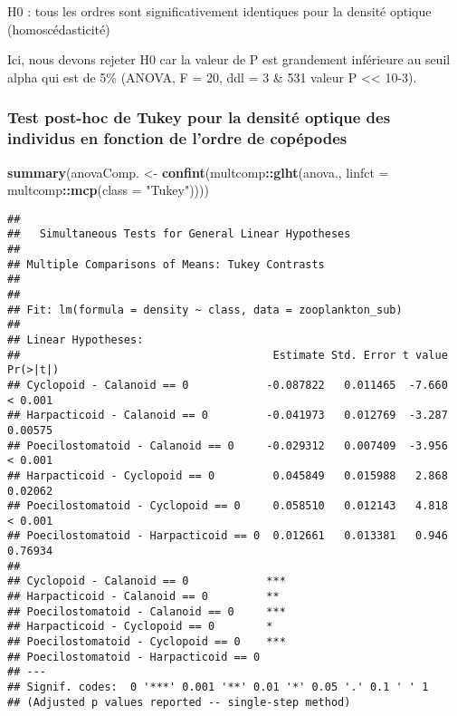 \documentclass[]{article}
\newenvironment{Shaded}{\begin{snugshade}}{\end{snugshade}}
\newcommand{\KeywordTok}[1]{\textcolor[rgb]{0.13,0.29,0.53}{\textbf{#1}}}
\newcommand{\DataTypeTok}[1]{\textcolor[rgb]{0.13,0.29,0.53}{#1}}
\newcommand{\StringTok}[1]{\textcolor[rgb]{0.31,0.60,0.02}{#1}}
\newcommand{\OperatorTok}[1]{\textcolor[rgb]{0.81,0.36,0.00}{\textbf{#1}}}
\newcommand{\NormalTok}[1]{#1}
\begin{document}
H0 : tous les ordres sont significativement identiques pour la densité
optique (homoscédasticité)

Ici, nous devons rejeter H0 car la valeur de P est grandement inférieure
au seuil alpha qui est de 5\% (ANOVA, F = 20, ddl = 3 \& 531 valeur P
\textless{}\textless{} 10-3).

\subsubsection{Test post-hoc de Tukey pour la densité optique des
individus en fonction de l'ordre de
copépodes}\label{test-post-hoc-de-tukey-pour-la-densite-optique-des-individus-en-fonction-de-lordre-de-copepodes}

\begin{Shaded}
\begin{Highlighting}[]
\KeywordTok{summary}\NormalTok{(anovaComp. <-}\StringTok{ }\KeywordTok{confint}\NormalTok{(multcomp}\OperatorTok{::}\KeywordTok{glht}\NormalTok{(anova.,}
  \DataTypeTok{linfct =}\NormalTok{ multcomp}\OperatorTok{::}\KeywordTok{mcp}\NormalTok{(}\DataTypeTok{class =} \StringTok{"Tukey"}\NormalTok{))))}
\end{Highlighting}
\end{Shaded}

\begin{verbatim}
## 
##   Simultaneous Tests for General Linear Hypotheses
## 
## Multiple Comparisons of Means: Tukey Contrasts
## 
## 
## Fit: lm(formula = density ~ class, data = zooplankton_sub)
## 
## Linear Hypotheses:
##                                       Estimate Std. Error t value Pr(>|t|)
## Cyclopoid - Calanoid == 0            -0.087822   0.011465  -7.660  < 0.001
## Harpacticoid - Calanoid == 0         -0.041973   0.012769  -3.287  0.00575
## Poecilostomatoid - Calanoid == 0     -0.029312   0.007409  -3.956  < 0.001
## Harpacticoid - Cyclopoid == 0         0.045849   0.015988   2.868  0.02062
## Poecilostomatoid - Cyclopoid == 0     0.058510   0.012143   4.818  < 0.001
## Poecilostomatoid - Harpacticoid == 0  0.012661   0.013381   0.946  0.76934
##                                         
## Cyclopoid - Calanoid == 0            ***
## Harpacticoid - Calanoid == 0         ** 
## Poecilostomatoid - Calanoid == 0     ***
## Harpacticoid - Cyclopoid == 0        *  
## Poecilostomatoid - Cyclopoid == 0    ***
## Poecilostomatoid - Harpacticoid == 0    
## ---
## Signif. codes:  0 '***' 0.001 '**' 0.01 '*' 0.05 '.' 0.1 ' ' 1
## (Adjusted p values reported -- single-step method)
\end{verbatim}
\end{document}
